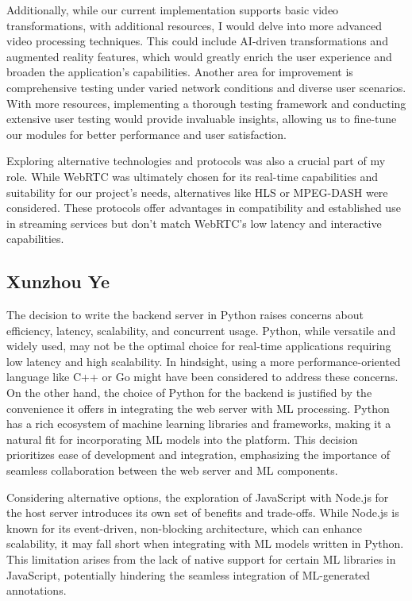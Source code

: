 \documentclass[12pt, titlepage]{article}
\begin{document}
Additionally, while our current implementation supports basic video transformations, with additional resources, I would delve into more advanced video processing techniques. This could include AI-driven transformations and augmented reality features, which would greatly enrich the user experience and broaden the application's capabilities. Another area for improvement is comprehensive testing under varied network conditions and diverse user scenarios. With more resources, implementing a thorough testing framework and conducting extensive user testing would provide invaluable insights, allowing us to fine-tune our modules for better performance and user satisfaction.

Exploring alternative technologies and protocols was also a crucial part of my role. While WebRTC was ultimately chosen for its real-time capabilities and suitability for our project's needs, alternatives like HLS or MPEG-DASH were considered. These protocols offer advantages in compatibility and established use in streaming services but don't match WebRTC's low latency and interactive capabilities.

\subsection{Xunzhou Ye}
The decision to write the backend server in Python raises concerns about efficiency, latency, scalability, and concurrent usage. Python, while versatile and widely used, may not be the optimal choice for real-time applications requiring low latency and high scalability. In hindsight, using a more performance-oriented language like C++ or Go might have been considered to address these concerns. On the other hand, the choice of Python for the backend is justified by the convenience it offers in integrating the web server with ML processing. Python has a rich ecosystem of machine learning libraries and frameworks, making it a natural fit for incorporating ML models into the platform. This decision prioritizes ease of development and integration, emphasizing the importance of seamless collaboration between the web server and ML components.

Considering alternative options, the exploration of JavaScript with Node.js for the host server introduces its own set of benefits and trade-offs. While Node.js is known for its event-driven, non-blocking architecture, which can enhance scalability, it may fall short when integrating with ML models written in Python. This limitation arises from the lack of native support for certain ML libraries in JavaScript, potentially hindering the seamless integration of ML-generated annotations.


\newpage{}
\end{document}
